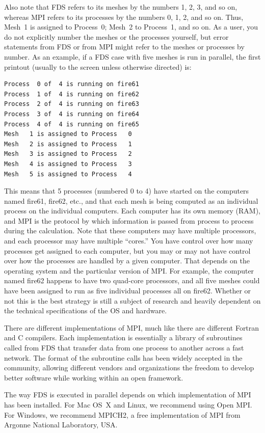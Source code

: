 \documentclass[11pt]{book}
\begin{document}
Also note that FDS refers to its meshes by the numbers 1, 2, 3, and so on, whereas MPI refers to its processes by the numbers
0, 1, 2, and so on. Thus, Mesh~1 is assigned to Process~0; Mesh~2 to Process~1, and so on.
As a user, you do not explicitly number the meshes or the processes yourself, but
error statements from FDS or from MPI might refer to the meshes or processes by number.
As an example, if a FDS case with five meshes is run in parallel, the first printout (usually to the screen unless
otherwise directed) is:
\footnotesize
\begin{verbatim}
Process  0 of  4 is running on fire61
Process  1 of  4 is running on fire62
Process  2 of  4 is running on fire63
Process  3 of  4 is running on fire64
Process  4 of  4 is running on fire65
Mesh   1 is assigned to Process   0
Mesh   2 is assigned to Process   1
Mesh   3 is assigned to Process   2
Mesh   4 is assigned to Process   3
Mesh   5 is assigned to Process   4
\end{verbatim} \normalsize
This means that 5 processes (numbered 0 to 4) have started on the computers named fire61, fire62, etc., and that each mesh is being computed as an individual process on the
individual computers. Each computer has its own memory (RAM), and MPI is the protocol by which information is passed from process to process during the calculation. Note that these
computers may have multiple processors, and each processor may have multiple ``cores.'' You have control over how many processes get assigned to each computer, but you may or may not
have control over how the processes are handled by a given computer. That depends on the operating system and the particular version of MPI. For example, the computer named fire62 happens to have
two quad-core processors, and all five meshes could have been assigned to run as five individual processes all on fire62. Whether or not this is the best strategy is still a subject of
research and heavily dependent on the technical specifications of the OS and hardware.


There are different implementations of MPI, much like there
are different Fortran and C compilers. Each implementation is
essentially a library of subroutines called from FDS that transfer
data from one process to another across a fast network. The format of
the subroutine calls has been widely accepted in the community,
allowing different vendors and organizations the freedom to develop
better software while working within an open framework.

The way FDS is executed in parallel depends on which implementation of MPI has been installed.  For Mac OS~X and Linux, we recommend using Open MPI. For Windows, we recommend MPICH2, a free implementation of MPI from Argonne National Laboratory, USA.
\end{document}
